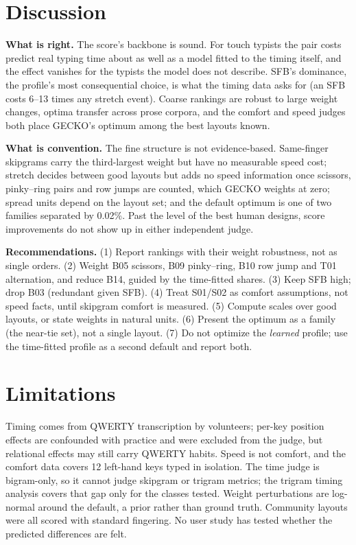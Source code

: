 \documentclass{gecko-paper}
\begin{document}
\begin{paperbody}
\section{Discussion}
\textbf{What is right.} The score's backbone is sound. For touch typists the pair costs predict real typing time about as well as a model fitted to the timing itself, and the effect vanishes for the typists the model does not describe. SFB's dominance, the profile's most consequential choice, is what the timing data asks for (an SFB costs 6–13 times any stretch event). Coarse rankings are robust to large weight changes, optima transfer across prose corpora, and the comfort and speed judges both place GECKO's optimum among the best layouts known.

\textbf{What is convention.} The fine structure is not evidence-based. Same-finger skipgrams carry the third-largest weight but have no measurable speed cost; stretch decides between good layouts but adds no speed information once scissors, pinky–ring pairs and row jumps are counted, which GECKO weights at zero; spread units depend on the layout set; and the default optimum is one of two families separated by 0.02\%. Past the level of the best human designs, score improvements do not show up in either independent judge.

\textbf{Recommendations.} (1) Report rankings with their weight robustness, not as single orders. (2) Weight B05 scissors, B09 pinky–ring, B10 row jump and T01 alternation, and reduce B14, guided by the time-fitted shares. (3) Keep SFB high; drop B03 (redundant given SFB). (4) Treat S01/S02 as comfort assumptions, not speed facts, until skipgram comfort is measured. (5) Compute scales over good layouts, or state weights in natural units. (6) Present the optimum as a family (the near-tie set), not a single layout. (7) Do not optimize the \emph{learned} profile; use the time-fitted profile as a second default and report both.

\section{Limitations}
Timing comes from QWERTY transcription by volunteers; per-key position effects are confounded with practice and were excluded from the judge, but relational effects may still carry QWERTY habits. Speed is not comfort, and the comfort data covers 12 left-hand keys typed in isolation. The time judge is bigram-only, so it cannot judge skipgram or trigram metrics; the trigram timing analysis covers that gap only for the classes tested. Weight perturbations are log-normal around the default, a prior rather than ground truth. Community layouts were all scored with standard fingering. No user study has tested whether the predicted differences are felt.


\end{paperbody}
\end{document}
